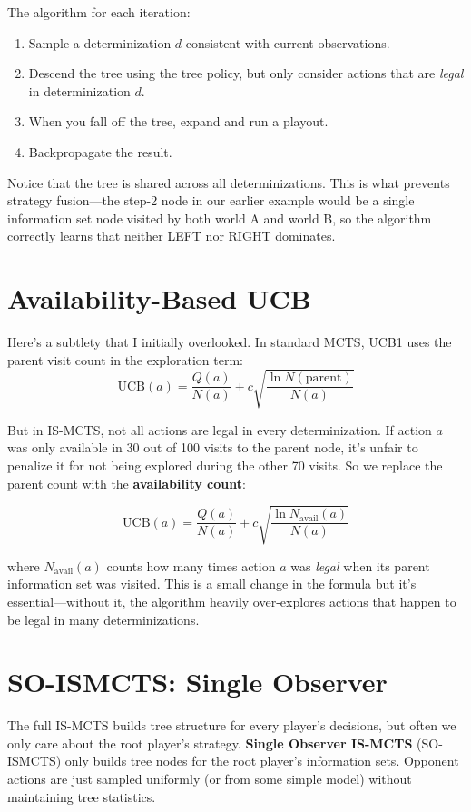 \documentclass[11pt]{article}
\begin{document}
The algorithm for each iteration:
\begin{enumerate}
\item Sample a determinization $d$ consistent with current observations.
\item Descend the tree using the tree policy, but only consider actions that are \emph{legal} in determinization $d$.
\item When you fall off the tree, expand and run a playout.
\item Backpropagate the result.
\end{enumerate}

Notice that the tree is shared across all determinizations. This is what prevents strategy fusion---the step-2 node in our earlier example would be a single information set node visited by both world A and world B, so the algorithm correctly learns that neither LEFT nor RIGHT dominates.

\section{Availability-Based UCB}

Here's a subtlety that I initially overlooked. In standard MCTS, UCB1 uses the parent visit count in the exploration term:
\[
\text{UCB}(a) = \frac{Q(a)}{N(a)} + c\sqrt{\frac{\ln N(\text{parent})}{N(a)}}
\]

But in IS-MCTS, not all actions are legal in every determinization. If action $a$ was only available in 30 out of 100 visits to the parent node, it's unfair to penalize it for not being explored during the other 70 visits. So we replace the parent count with the \textbf{availability count}:

\[
\boxed{\text{UCB}(a) = \frac{Q(a)}{N(a)} + c\sqrt{\frac{\ln N_{\text{avail}}(a)}{N(a)}}}
\]

where $N_{\text{avail}}(a)$ counts how many times action $a$ was \emph{legal} when its parent information set was visited. This is a small change in the formula but it's essential---without it, the algorithm heavily over-explores actions that happen to be legal in many determinizations.

\section{SO-ISMCTS: Single Observer}

The full IS-MCTS builds tree structure for every player's decisions, but often we only care about the root player's strategy. \textbf{Single Observer IS-MCTS} (SO-ISMCTS) only builds tree nodes for the root player's information sets. Opponent actions are just sampled uniformly (or from some simple model) without maintaining tree statistics.
\end{document}
